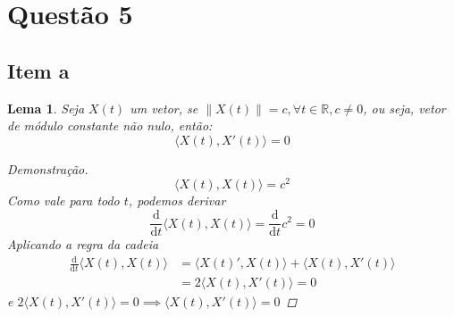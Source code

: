 \documentclass[12pt,letterpaper]{article}
\newtheorem{lemma}{Lema}
\begin{document}
\section*{Questão 5}
\subsection*{Item a}
\begin{lemma}
Seja \(X(t)\) um vetor, se \(\lVert X(t) \rVert = c, \forall t \in \mathbb{R}, c\neq 0\), ou seja, vetor de módulo constante não nulo, então:
\[\langle X(t), X'(t) \rangle = 0\]
\begin{proof}[Demonstração]
\[\langle X(t), X(t) \rangle = c^2\]
Como vale para todo \(t\), podemos derivar
\[ \frac{\mathrm{d}}{\mathrm{d}t}\langle X(t), X(t) \rangle = \frac{\mathrm{d}}{\mathrm{d}t}c^2 = 0 \]
Aplicando a regra da cadeia
\begin{align*}
  \frac{\mathrm{d}}{\mathrm{d}t} \langle X(t), X(t) \rangle &=  \langle X(t)', X(t) \rangle + \langle X(t), X'(t) \rangle \\
  &= 2 \langle X(t), X'(t) \rangle = 0
\end{align*}
e \(2 \langle X(t), X'(t) \rangle = 0 \implies \langle X(t), X'(t) \rangle = 0\)
\end{proof}
\end{lemma}
\end{document}

